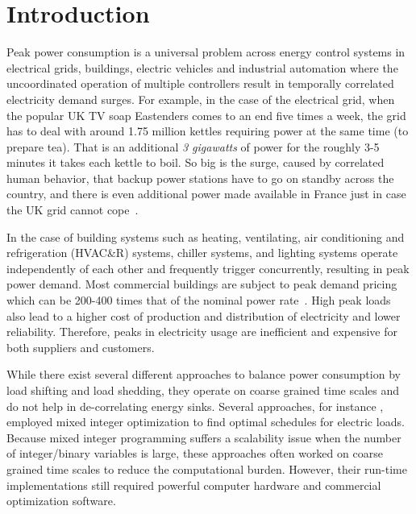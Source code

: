\section{Introduction}
\label{sec:intro}

Peak power consumption is a universal problem across energy control systems in electrical grids, buildings, electric vehicles and industrial automation where the uncoordinated operation of multiple controllers result in  temporally correlated electricity demand surges. For example, in the case of the electrical grid, when the popular UK TV soap Eastenders comes to an end five times a week, the grid has to deal with around 1.75 million kettles requiring power at the same time (to prepare tea). That is an additional \emph{3 gigawatts} of power for the roughly 3-5 minutes it takes each kettle to boil. So big is the surge, caused by correlated human behavior, that backup power stations have to go on standby across the country, and there is even additional power made available in France just in case the UK grid cannot cope~\cite{tvpickup}. 

In the case of building systems such as heating, ventilating, air conditioning and refrigeration (HVAC\&R) systems, chiller systems, and lighting systems operate independently of each other and frequently trigger concurrently, resulting in peak power demand. Most commercial buildings are subject to peak demand pricing which can be 200-400 times that of the nominal power rate~\cite{trfpeco}. High peak loads also lead to a higher cost of production and distribution of electricity and lower reliability. Therefore, peaks in electricity usage are inefficient and expensive for both suppliers and customers.


While there exist several different approaches to balance power consumption by load shifting and load shedding, they operate on coarse grained time scales and do not help in de-correlating energy sinks.
Several approaches, for instance \cite{sou2011scheduling,zhang2011optimal}, employed mixed integer optimization to find optimal schedules for electric loads.
Because mixed integer programming suffers a scalability issue when the number of integer/binary variables is large, these approaches often worked on coarse grained time scales to reduce the computational burden.
However, their run-time implementations still required powerful computer hardware and commercial optimization software.

